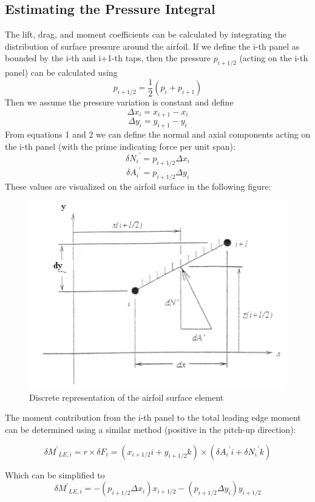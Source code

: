 \documentclass[12pt]{article}
\begin{document}
\subsection{Estimating the Pressure Integral}
The lift, drag, and moment coefficients can be calculated by integrating the distribution of surface pressure around the airfoil. If we define the i-th panel as bounded by the i-th and i+1-th taps, then the pressure \(p_{i+1/2}\) (acting on the i-th panel) can be calculated using
\[p_{i+1/2}=\frac{1}{2}\left( p_{i} + p_{i+1}\right)\]
Then we assume the pressure variation is constant and define
\[\Delta x_i = x_{i+1} - x_i\]
\[\Delta y_i = y_{i+1} - y_i\]
From equations 1 and 2 we can define the normal and axial components acting on the i-th panel (with the prime indicating force per unit span):
\[\delta {N_i}^{'}=p_{i+1/2}\Delta x_i\]
\[\delta {A_i}^{'}=p_{i+1/2}\Delta y_i\]
These values are visualized on the airfoil surface in the following figure:
    \begin{figure}[h]
        \includegraphics[width=12 cm]{pic3.PNG}
        \centering
        \caption{Discrete representation of the airfoil surface element}
    \end{figure}
    The moment contribution from the i-th panel to the total leading edge moment can be determined using a similar method (positive in the pitch-up direction):

\[\delta {M^'}_{LE,i} = r \times \delta F_i = \left( x_{i+1/2}i+y_{i+1/2}k \right) \times  \left( \delta {{A_{i}}^'} i +\delta {{N_{i}}^'} k \right)\]

Which can be simplified to
\[\delta {M^'}_{LE,i} = -\left( p_{i+1/2}\Delta x_i \right)x_{i+1/2}-\left( p_{i+1/2} \Delta y_i \right) y_{i+1/2}\]
\end{document}
